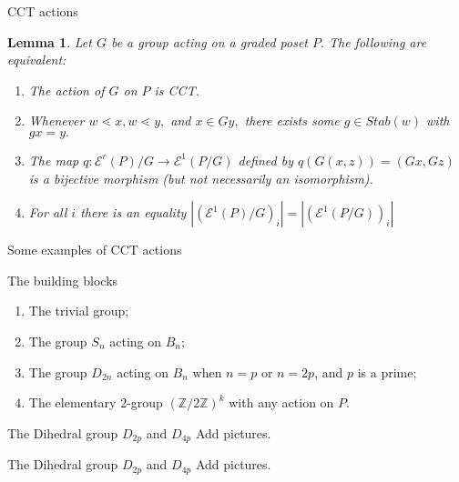 \documentclass{beamer}
\newtheorem{lem}[thm]{Lemma}
\theoremstyle{remark}
\begin{document}
\begin{frame}{CCT actions}
\begin{lem}
\label{lem:cover_transitive_equivalence}
Let $G$ be a group acting on a graded poset $P.$ The following are equivalent:
\begin{enumerate}
	\item The action of $G$ on $P$ is CCT.
	\item Whenever $w \lessdot x,w \lessdot y,$ and $x \in Gy,$ there exists some $g \in Stab(w)$ with $gx = y.$
	\item The map $q\colon \mathcal E^r(P)/G\rightarrow \mathcal E^1(P/G)$ defined by $q(G(x, z)) = (Gx,Gz)$ is a bijective morphism (but not necessarily an isomorphism).
	\item For all $i$ there is an equality $|(\mathcal E^1(P)/G)_i|=| (\mathcal E^1(P/G))_i|$
\end{enumerate}
\end{lem}

\end{frame}





\begin{frame}{Some examples of CCT actions}
\begin{block}{The building blocks}
\begin{enumerate}
\item The trivial group;
\pause
\item The group $S_n$ acting on $B_n$;
\pause
\item The group $D_{2n}$ acting on $B_{n}$ when $n = p$ or $n = 2p$, and $p$ is a prime;
\pause
\item The elementary $2$-group $(\mathbb Z /2 \mathbb Z)^k$ with any action on $P$.
\end{enumerate}
\end{block}
\end{frame}





\begin{frame}{The Dihedral group $D_{2p}$ and $D_{4p}$}
Add pictures.
\end{frame}





\begin{frame}{The Dihedral group $D_{2p}$ and $D_{4p}$}
Add pictures.
\end{frame}
\end{document}
